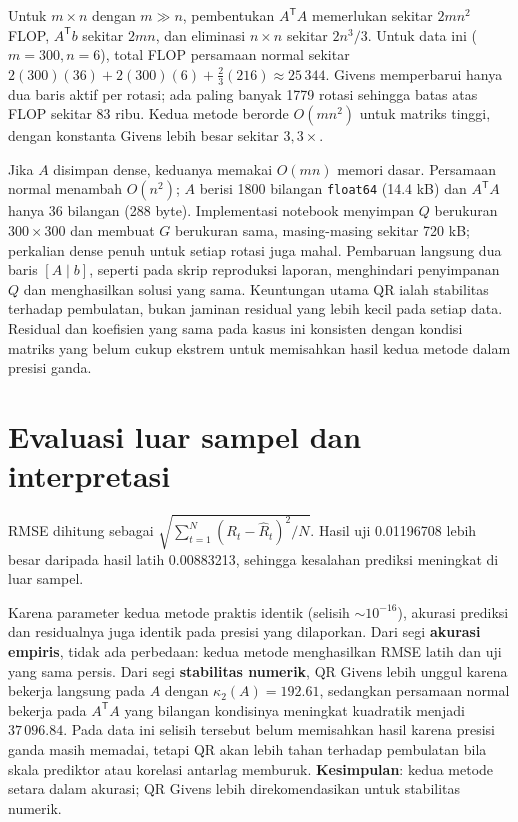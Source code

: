 \documentclass[11pt,a4paper]{article}
\numberwithin{equation}{section}
\begin{document}
Untuk $m\times n$ dengan $m\gg n$, pembentukan $A^\mathsf{T}A$ memerlukan sekitar $2mn^2$ FLOP, $A^\mathsf{T}b$ sekitar $2mn$, dan eliminasi $n\times n$ sekitar $2n^3/3$. Untuk data ini ($m=300,n=6$), total FLOP persamaan normal sekitar $2(300)(36)+2(300)(6)+\tfrac{2}{3}(216)\approx25\,344$. Givens memperbarui hanya dua baris aktif per rotasi; ada paling banyak 1779 rotasi sehingga batas atas FLOP sekitar 83 ribu. Kedua metode berorde $O(mn^2)$ untuk matriks tinggi, dengan konstanta Givens lebih besar sekitar $3{,}3\times$.

Jika $A$ disimpan dense, keduanya memakai $O(mn)$ memori dasar. Persamaan normal menambah $O(n^2)$; $A$ berisi 1800 bilangan \texttt{float64} (14.4 kB) dan $A^\mathsf{T}A$ hanya 36 bilangan (288 byte). Implementasi notebook menyimpan $Q$ berukuran $300\times300$ dan membuat $G$ berukuran sama, masing-masing sekitar 720 kB; perkalian dense penuh untuk setiap rotasi juga mahal. Pembaruan langsung dua baris $[A\mid b]$, seperti pada skrip reproduksi laporan, menghindari penyimpanan $Q$ dan menghasilkan solusi yang sama. Keuntungan utama QR ialah stabilitas terhadap pembulatan, bukan jaminan residual yang lebih kecil pada setiap data. Residual dan koefisien yang sama pada kasus ini konsisten dengan kondisi matriks yang belum cukup ekstrem untuk memisahkan hasil kedua metode dalam presisi ganda.

\section{Evaluasi luar sampel dan interpretasi}
RMSE dihitung sebagai $\sqrt{\sum_{t=1}^{N}(R_t-\widehat R_t)^2/N}$. Hasil uji 0.01196708 lebih besar daripada hasil latih 0.00883213, sehingga kesalahan prediksi meningkat di luar sampel.

Karena parameter kedua metode praktis identik (selisih $\sim 10^{-16}$), akurasi prediksi dan residualnya juga identik pada presisi yang dilaporkan. Dari segi \textbf{akurasi empiris}, tidak ada perbedaan: kedua metode menghasilkan RMSE latih dan uji yang sama persis. Dari segi \textbf{stabilitas numerik}, QR Givens lebih unggul karena bekerja langsung pada $A$ dengan $\kappa_2(A)=192.61$, sedangkan persamaan normal bekerja pada $A^\mathsf{T}A$ yang bilangan kondisinya meningkat kuadratik menjadi $37\,096.84$. Pada data ini selisih tersebut belum memisahkan hasil karena presisi ganda masih memadai, tetapi QR akan lebih tahan terhadap pembulatan bila skala prediktor atau korelasi antarlag memburuk. \textbf{Kesimpulan}: kedua metode setara dalam akurasi; QR Givens lebih direkomendasikan untuk stabilitas numerik.
\end{document}
